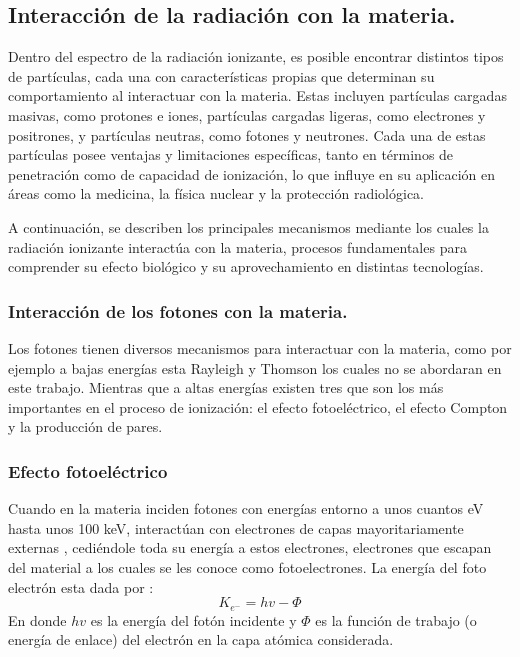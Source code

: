 \documentclass[onecolumn,12pt]{article} %
\begin{document}
\subsection{Interacción de la radiación con la materia.} \label{subsec:interacción}



Dentro del espectro de la radiación ionizante, es posible encontrar distintos tipos de partículas, cada una con características propias que determinan su comportamiento al interactuar con la materia. Estas incluyen partículas cargadas masivas, como protones e iones, partículas cargadas ligeras, como electrones y positrones,  y partículas neutras, como fotones y neutrones. Cada una de estas partículas posee ventajas y limitaciones específicas, tanto en términos de penetración como de capacidad de ionización, lo que influye en su aplicación en áreas como la medicina, la física nuclear y la protección radiológica.

A continuación, se describen los principales mecanismos mediante los cuales la radiación ionizante interactúa con la materia, procesos fundamentales para comprender su efecto biológico y su aprovechamiento en distintas tecnologías.


\subsubsection{Interacción de los fotones con la materia.}
Los fotones tienen diversos mecanismos para interactuar con la materia, como por ejemplo a bajas energías esta Rayleigh y Thomson los cuales no se abordaran en este trabajo.  Mientras que a altas energías existen tres que son los más importantes en el proceso de ionización: el efecto fotoeléctrico, el efecto Compton y la producción de pares.

\subsubsection*{Efecto fotoeléctrico}
Cuando en la materia inciden fotones con energías entorno a unos  cuantos eV hasta unos 100 keV, interactúan con electrones de  capas mayoritariamente externas \cite{fotoelectrico}, cediéndole toda su energía a estos electrones, electrones que escapan del material a los cuales se les conoce como fotoelectrones.  La energía del foto electrón esta dada por :
\begin{equation}
    K_{e^-}=hv-\Phi 
\end{equation}
En donde $hv$ es la energía del fotón incidente y $\Phi $ es la  función de trabajo (o energía de enlace) del electrón en la capa atómica considerada.
\end{document}
